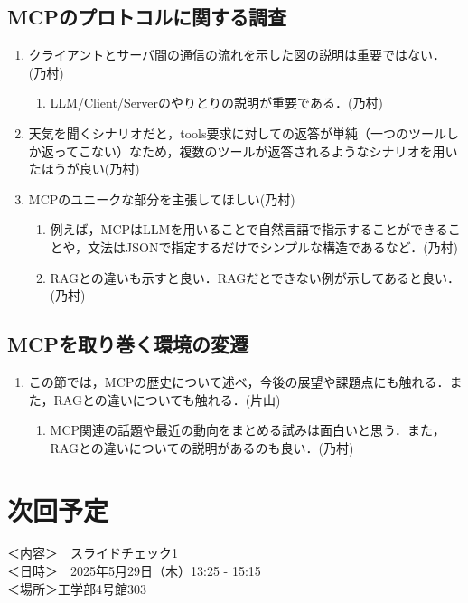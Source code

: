 \documentclass[dvipdfmx]{jsarticle}
\begin{document}
\subsection{MCPのプロトコルに関する調査}
\begin{enumerate}
    \item クライアントとサーバ間の通信の流れを示した図の説明は重要ではない．\hfill{(乃村)}\\
    \begin{enumerate}
        \item LLM/Client/Serverのやりとりの説明が重要である．\hfill{(乃村)}\\
    \end{enumerate}
    \item 天気を聞くシナリオだと，tools要求に対しての返答が単純（一つのツールしか返ってこない）なため，複数のツールが返答されるようなシナリオを用いたほうが良い\hfill{(乃村)}\\
    \item MCPのユニークな部分を主張してほしい\hfill{(乃村)}\\
    \begin{enumerate}
        \item 例えば，MCPはLLMを用いることで自然言語で指示することができることや，文法はJSONで指定するだけでシンプルな構造であるなど．\hfill{(乃村)}\\
        \item RAGとの違いも示すと良い．RAGだとできない例が示してあると良い．\hfill{(乃村)}\\
    \end{enumerate}
\end{enumerate}

\subsection{MCPを取り巻く環境の変遷}
\begin{enumerate}
    \item この節では，MCPの歴史について述べ，今後の展望や課題点にも触れる．また，RAGとの違いについても触れる．\hfill{(片山)}
    \begin{enumerate}
        \item MCP関連の話題や最近の動向をまとめる試みは面白いと思う．また，RAGとの違いについての説明があるのも良い．\hfill{(乃村)}\\
    \end{enumerate}
\end{enumerate}

\section{次回予定}
＜内容＞　スライドチェック1\\
＜日時＞　2025年5月29日（木）13:25 - 15:15\\
＜場所＞工学部4号館303\\
\end{document}
